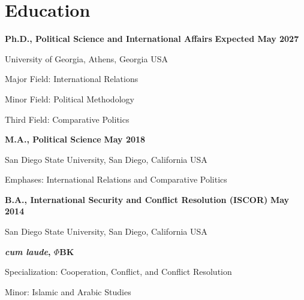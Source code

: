 \documentclass[letterpaper,12pt]{article}
\newenvironment{list1}{
  \begin{list}{}{
      \setlength{\itemsep}{0in}
      \setlength{\parsep}{0in} \setlength{\parskip}{0in}
      \setlength{\topsep}{0in} \setlength{\partopsep}{0in} 
      \setlength{\leftmargin}{0in}}}{\end{list}}
\newenvironment{list2}{
  \begin{list}{$\bullet$}{%
      \setlength{\itemsep}{0in}
      \setlength{\parsep}{0in} 
      \setlength{\parskip}{0in}
      \setlength{\topsep}{0in} 
      \setlength{\partopsep}{0in}
      \setlength{\leftmargin}{1in}
      \setlength{\labelsep}{1em}
      \setlength{\labelwidth}{1em}
      \setlength{\itemindent}{-2em}
      \setlength{\listparindent}{2em}}}{\end{list}}
\begin{document}
\section{Education}
{\bf Ph.D., Political Science and International Affairs} \hfill {\bf Expected May 2027}
\begin{list1} 
\item University of Georgia, Athens, Georgia USA
\item Major Field: International Relations
\item Minor Field: Political Methodology
\item Third Field: Comparative Politics
\end{list1}
\par
{\bf M.A., Political Science} \hfill {\bf May 2018}
\begin{list1} 
\item San Diego State University, San Diego, California USA
\item Emphases: International Relations and Comparative Politics
\end{list1}
\par
{\bf B.A., International Security and Conflict Resolution (ISCOR)} \hfill {\bf May 2014}
\begin{list1} 
\item San Diego State University, San Diego, California USA
\item \textbf{\textit{cum laude}, $\Phi$BK}
\item Specialization: Cooperation, Conflict, and Conflict Resolution
\item Minor: Islamic and Arabic Studies
\end{list1}

\end{document}
